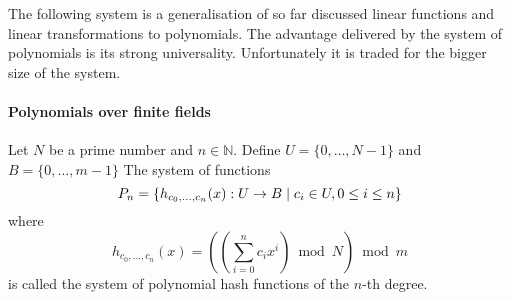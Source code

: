 The following system is a generalisation of so far discussed linear functions and linear transformations to polynomials. The advantage delivered by the system of polynomials is its strong universality. Unfortunately it is traded for the bigger size of the system.

\paragraph{Polynomials over finite fields}
\begin{definition}
Let $N$ be a prime number and $n \in \mathbb{N}$. Define $U = \{0, \dots, N - 1 \}$ and $B = \{0, \dots, m - 1\}$ The system of functions \[ P_n = \left\lbrace h_{c_0, \dots, c_n}(x): U \rightarrow B \mid c_i \in U, 0 \leq i \leq n \right\rbrace \] where \[ h_{c_0, \dots, c_n}(x) = \left( \left(\displaystyle \sum_{i=0}^{n} c_i x^i \right) \bmod N \right) \bmod m \] is called the system of polynomial hash functions of the $n$-th degree.
\end{definition}

